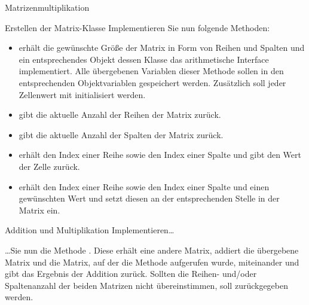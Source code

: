 \documentclass{../tuda-exercise}
\begin{document}
\begin{task}[credit=\stars{3}{3}]{Matrizenmultiplikation}
\begin{subtask*}{Erstellen der Matrix-Klasse}
      Implementieren Sie nun folgende Methoden:

      \begin{itemize}
        \item {} erhält
        die gewünschte Größe der Matrix in Form von Reihen und Spalten und ein entsprechendes
        Objekt dessen Klasse das arithmetische Interface implementiert. Alle übergebenen
        Variablen dieser Methode sollen in den entsprechenden Objektvariablen gespeichert werden.
        Zusätzlich soll jeder Zellenwert mit  initialisiert werden.
        \item {} gibt die aktuelle Anzahl der Reihen der Matrix
        zurück.
        \item {} gibt die aktuelle Anzahl der Spalten der
        Matrix zurück.
        \item {} erhält den Index einer Reihe
        sowie den Index einer Spalte und gibt den Wert der Zelle zurück.
        \item {} erhält den Index
        einer Reihe sowie den Index einer Spalte und einen gewünschten Wert und setzt diesen an
        der entsprechenden Stelle in der Matrix ein.
      \end{itemize}

      \begin{solution}
        

        \clearpage

        
      \end{solution}
    \end{subtask*}

    \begin{subtask*}{Addition und Multiplikation}
      Implementieren\dots

      \br

      \dots Sie nun die Methode . Diese erhält
      eine andere Matrix, addiert die übergebene Matrix und die Matrix, auf der die Methode
      aufgerufen wurde, miteinander und gibt das Ergebnis der Addition zurück. Sollten die
      Reihen- und/oder Spaltenanzahl der beiden Matrizen nicht übereinstimmen, soll
       zurückgegeben werden.


\end{subtask*}
\end{task}
\end{document}
